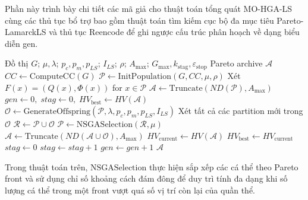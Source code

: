 \documentclass[14pt,a4paper]{extarticle}
\begin{document}
Phần này trình bày chi tiết các mã giả cho thuật toán tổng quát MO-HGA-LS cùng các thủ tục bổ trợ bao gồm thuật toán tìm kiếm cục bộ đa mục tiêu Pareto-LamarckLS và thủ tục Reencode để ghi ngược cấu trúc phân hoạch về dạng biểu diễn gen.

\begin{algorithm}[H]
\caption{MO-HGA-LS}
\renewcommand{\alglinenumber}[1]{\normalsize #1.}
\begin{algorithmic}[1]
\Require Đồ thị $G$; $\mu,\lambda$; $p_c,p_m,p_{LS}$; $I_{LS}$; $\rho$; $A_{\max}$; $G_{\max},k_{\mathrm{stag}},\varepsilon_{\mathrm{stop}}$
\Ensure Pareto archive $\mathcal{A}$
\State $CC\leftarrow\mathrm{ComputeCC}(G)$
\State $\mathcal{P}\leftarrow\mathrm{InitPopulation}(G,CC,\mu,\rho)$
\State Xét $F(x)=(Q(x),\Phi(x))$ for $x\in\mathcal{P}$
\State $\mathcal{A}\leftarrow\mathrm{Truncate}(ND(\mathcal{P}),A_{\max})$
\State $gen\leftarrow0,\;stag\leftarrow0,\;HV_{\mathrm{best}}\leftarrow HV(\mathcal{A})$
    \State $\mathcal{O}\leftarrow\mathrm{GenerateOffspring}(\mathcal{P},\lambda,p_c,p_m,p_{LS},I_{LS})$
    \State Xét tất cả các partition mới trong $\mathcal{O}$
    \State $\mathcal{R}\leftarrow\mathcal{P}\cup\mathcal{O}$
    \State $\mathcal{P}\leftarrow\mathrm{NSGASelection}(\mathcal{R},\mu)$
    \State $\mathcal{A}\leftarrow\mathrm{Truncate}(ND(\mathcal{A}\cup\mathcal{O}),A_{\max})$
    \State $HV_{\mathrm{current}}\leftarrow HV(\mathcal{A})$
        \State $HV_{\mathrm{best}}\leftarrow HV_{\mathrm{current}}$
        \State $stag\leftarrow0$
    \Else
        \State $stag\leftarrow stag+1$
    \EndIf
    \State $gen\leftarrow gen+1$
\EndWhile
\State \Return $\mathcal{A}$
\end{algorithmic}
\end{algorithm}

Trong thuật toán trên, $\text{NSGASelection}$ thực hiện sắp xếp các cá thể theo Pareto front và sử dụng chỉ số khoảng cách đám đông để duy trì tính đa dạng khi số lượng cá thể trong một front vượt quá số vị trí còn lại của quần thể.
\end{document}
